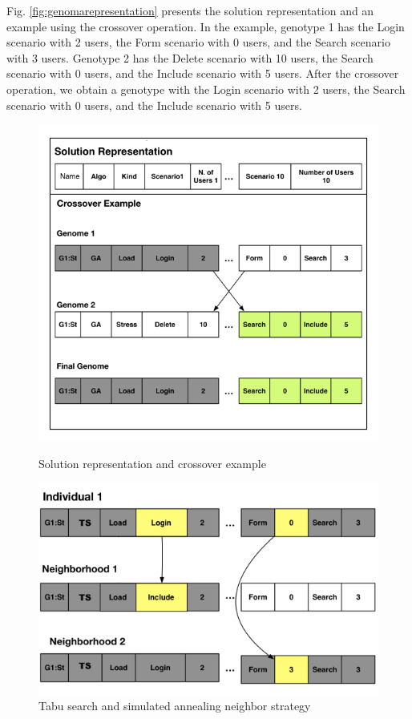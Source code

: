 Fig. \ref{fig:genomarepresentation} presents the solution representation and an example using the crossover operation. In the example, genotype 1 has the Login scenario with 2 users, the Form scenario with 0 users, and the Search scenario with 3 users. Genotype 2 has the Delete scenario with 10 users, the Search scenario with 0 users, and the Include scenario with 5 users. After the crossover operation, we obtain a genotype with the Login scenario with 2 users, the Search scenario with 0 users, and the Include scenario with 5 users.

\begin{figure}[h]
\begin{minipage}{.5\textwidth}
\centering
\includegraphics[width=1\textwidth]{./images/genomerepresentation1.png}
\caption{Solution representation and crossover example \citep{Gois2016}}
\label{fig:genomarepresentation}
\end{minipage}
\begin{minipage}{.5\textwidth}
\centering
\includegraphics[width=1\textwidth]{./images/neighbor.png}
\caption{Tabu search and simulated annealing neighbor strategy \citep{Gois2016}}
\label{fig:neighbourtaby}
\end{minipage}
\end{figure}

